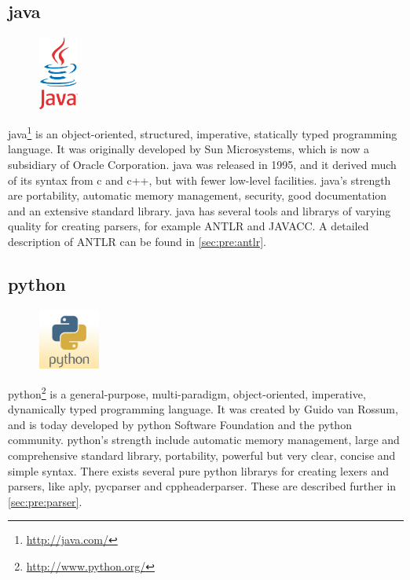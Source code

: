 \subsection{\Gls{java}}
\label{sec:pre:java}
\begin{figure}
	\vspace{-30pt}
	\includegraphics[width=1.3cm]{./planning/img/java_logo}
	\vspace{-30pt}
\end{figure}
\Gls{java}\footnote{\url{http://java.com/}} is an object-oriented, structured,
imperative, statically typed programming language. It was originally developed
by Sun Microsystems, which is now a subsidiary of Oracle Corporation. \Gls{java} was
released in 1995, and it derived much of its syntax from \Gls{c} and \Gls{c++}, but with
fewer low-level facilities. \Gls{java}’s strength are portability, automatic memory
management, security, good documentation and an extensive standard \gls{library}.
\Gls{java} has several tools and \glspl{library} of varying quality for creating \glspl{parser},
for example ANTLR and JAVACC. A detailed description of ANTLR can be found in 
\autoref{sec:pre:antlr}.

\subsection{python}
\label{sec:pre:python}
\begin{figure}
	\vspace{-20pt}
	\includegraphics[width=2cm]{./planning/img/python_logo}
	\vspace{-20pt}
\end{figure}
\Gls{python}\footnote{\url{http://www.python.org/}} is a general-purpose,
multi-paradigm, object-oriented, imperative, dynamically typed programming
language. It was created by Guido van Rossum, and is today developed by \Gls{python}
Software Foundation and the \Gls{python} community. \Gls{python}’s strength include
automatic memory management, large and comprehensive standard \gls{library},
portability, powerful but very clear, concise and simple syntax. There exists
several pure \Gls{python} \glspl{library} for creating \glspl{lexer} and \glspl{parser}, like \gls{aply},
\gls{pycparser} and cppheaderparser. These are described further in
\autoref{sec:pre:parser}.


